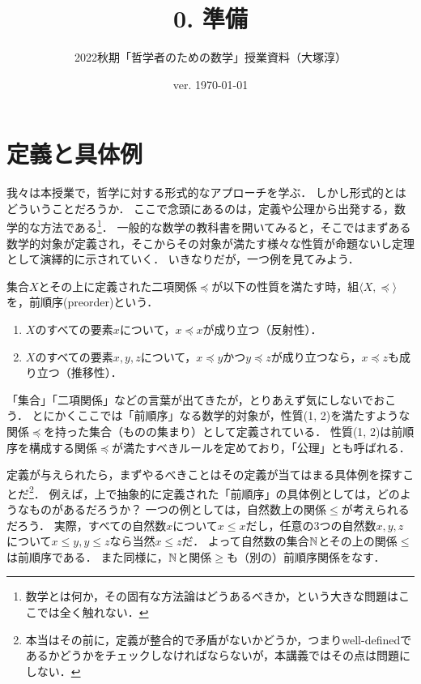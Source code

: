 \documentclass[11pt,a4paper]{jsarticle}
\begin{document}
\title{0. 準備}
\author{2022秋期「哲学者のための数学」授業資料（大塚淳）}
\date{ver. \today}
\maketitle



\section{定義と具体例}
我々は本授業で，哲学に対する形式的なアプローチを学ぶ．
しかし形式的とはどういうことだろうか．
ここで念頭にあるのは，定義や公理から出発する，数学的な方法である\footnote{数学とは何か，その固有な方法論はどうあるべきか，という大きな問題はここでは全く触れない．}．
一般的な数学の教科書を開いてみると，そこではまずある数学的対象が定義され，そこからその対象が満たす様々な性質が命題ないし定理として演繹的に示されていく．
いきなりだが，一つ例を見てみよう．

\begin{dfn}[前順序]
 集合$X$とその上に定義された二項関係$\preceq$が以下の性質を満たす時，組$\langle X, \preceq \rangle$を，前順序(preorder)という．
\begin{enumerate}
 \item $X$のすべての要素$x$について，$x \preceq x$が成り立つ（反射性）．
 \item $X$のすべての要素$x, y, z$について，$x \preceq y$かつ$y \preceq z$が成り立つなら，$x \preceq z$も成り立つ（推移性）．
\end{enumerate}
\end{dfn}

「集合」「二項関係」などの言葉が出てきたが，とりあえず気にしないでおこう．
とにかくここでは「前順序」なる数学的対象が，性質(1, 2)を満たすような関係$\preceq$を持った集合（ものの集まり）として定義されている．
性質(1, 2)は前順序を構成する関係$\preceq$が満たすべきルールを定めており，「公理」とも呼ばれる．

定義が与えられたら，まずやるべきことはその定義が当てはまる具体例を探すことだ\footnote{本当はその前に，定義が整合的で矛盾がないかどうか，つまりwell-definedであるかどうかをチェックしなければならないが，本講義ではその点は問題にしない．}．
例えば，上で抽象的に定義された「前順序」の具体例としては，どのようなものがあるだろうか？
一つの例としては，自然数上の関係$\leq$が考えられるだろう．
実際，すべての自然数$x$について$x \leq x$だし，任意の3つの自然数$x, y, z$について$x \leq y, y \leq z$なら当然$x \leq z$だ．
よって自然数の集合$\mathbb{N}$とその上の関係$\leq$は前順序である．
また同様に，$\mathbb{N}$と関係$\geq$も（別の）前順序関係をなす．
\end{document}
